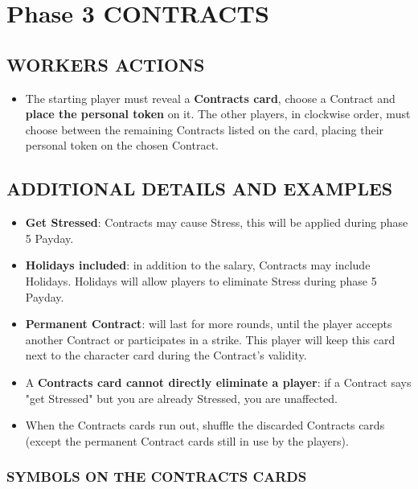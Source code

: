 \section{Phase 3 CONTRACTS}

    \subsection{WORKERS ACTIONS}

        \begin{itemize}
            \item The starting player must reveal a \textbf{Contracts card}, choose a Contract and
            \textbf{place the personal token} on it. The other players, in clockwise order, must
            choose between the remaining Contracts listed on the card, placing their
            personal token on the chosen Contract.
        \end{itemize}
    
    \subsection{ADDITIONAL DETAILS AND EXAMPLES}

        \begin{itemize}
            \item \textbf{Get Stressed}: Contracts may cause Stress, this will be applied during phase
            5 Payday.
            \item \textbf{Holidays included}: in addition to the salary, Contracts may include Holidays.
            Holidays will allow players to eliminate Stress during phase 5 Payday.
            \item \textbf{Permanent Contract}: will last for more rounds, until the player accepts another
            Contract or participates in a strike. This player will keep this card next
            to the character card during the Contract's validity.
            \item A \textbf{Contracts card cannot directly eliminate a player}: if a Contract says "get
            Stressed" but you are already Stressed, you are unaffected.
            \item When the Contracts cards run out, shuffle the discarded Contracts cards (except
            the permanent Contract cards still in use by the players).
        \end{itemize}

        \subsubsection{SYMBOLS ON THE CONTRACTS CARDS}

